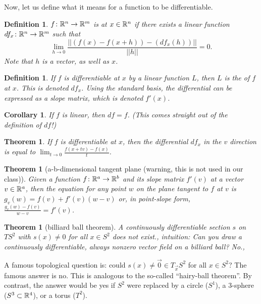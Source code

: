 \documentclass[11pt]{amsbook}
\theoremstyle{mystyle} %
\newtheorem{thrm}[thm]{Theorem}
\newtheorem{defi}[thm]{Definition}
\newtheorem{coro}[thm]{Corollary}
\numberwithin{thm}{section}
\begin{document}
Now, let us define what it means for a function to be differentiable.
\begin{defi}
	$f \colon {\mathbb R}^n \to {\mathbb R}^m$ is  at $x \in {\mathbb R}^n$ if there exists a linear function $df_x \colon {\mathbb R}^n \to {\mathbb R}^m$  such that $$\lim_{h \to 0} \frac{|| (f(x)-f(x+h)) - (df_x(h)) ||}{||h||} = 0.$$  Note that $h$ is a vector, as well as $x$.
\end{defi}
\begin{defi}
	If $f$ is differentiable at $x$ by a linear function $L$, then $L$ is the  of $f$ at $x$.  This is denoted $df_x$.  Using the standard basis, the differential can be expressed as a slope matrix, which is denoted $f'(x)$.
\end{defi}
\begin{coro}
	If $f$ is linear, then $df = f$.  (This comes straight out of the definition of $df$!)
\end{coro}

\begin{thrm}
	If $f$ is differentiable at $x$, then the differential $df_x$ in the $v$ direction is equal to $\lim_{t \to 0} \frac{f(x+tv) - f(x)}{t}$.
\end{thrm}


\begin{thrm}[a-b-dimensional tangent plane (warning, this is not used in our class)]
	Given a function $f \colon {\mathbb R}^a \to {\mathbb R}^b$ and its slope matrix $f'(v)$ at a vector $v \in {\mathbb R}^a$, then the equation for any point $w$ on the plane tangent to $f$ at $v$ is $g_v(w) = f(v) + f'(v)(w-v)$ or, in point-slope form, $\frac{g_v(w)-f(v)}{w-v} = f'(v)$.
\end{thrm}

\begin{thrm}[billiard ball theorem]
	A continuously differentiable section $s$ on $TS^2$ with $s(x) \neq 0$ for all $x \in S^2$ does not exist.,
	intuition: Can you draw a continuously differentiable, always nonzero vector field on a billiard ball?  No.,
\end{thrm}

A famous topological question is: could $s(x) \neq \vec{0} \in T_{\vec{x}}S^2$
for all $x \in S^2$? The famous answer is no. This is analogous to the
so-called ``hairy-ball theorem''. By contrast, the answer would be yes if $S^2$
were replaced by a circle ($S^1$), a 3-sphere ($S^3 \subset {\mathbb R}^4$), or a torus
($T^2$).
\end{document}
